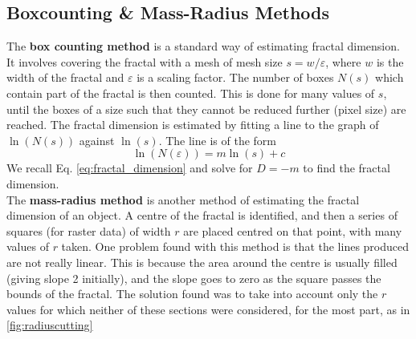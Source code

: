 \documentclass{article}
\theoremstyle{definition}
\theoremstyle{remark}
\begin{document}
\subsection{Boxcounting \& Mass-Radius Methods}
\indent The \textbf{box counting method} is a standard way of estimating fractal dimension. It involves covering the fractal with a mesh of mesh size $s = w/\varepsilon$, where $w$ is the width of the fractal and $\varepsilon$ is a scaling factor. The number of boxes $N(s)$ which contain part of the fractal is then counted. This is done for many values of $s$, until the boxes of a size such that they cannot be reduced further (pixel size) are reached. The fractal dimension is estimated by fitting a line to the graph of $\ln(N(s))$ against $\ln(s)$. The line is of the form
\begin{equation}
        \ln(N(\varepsilon)) = m\ln(s) + c
\end{equation}
We recall Eq. \ref{eq:fractal_dimension} and solve for $D=-m$ to find the fractal dimension.\\
\indent The \textbf{mass-radius method} is another method of estimating the fractal dimension of an object. A centre of the fractal is identified, and then a series of squares (for raster data) of width $r$ are placed centred on that point, with many values of $r$ taken. One problem found with this method is that the lines produced are not really linear. This is because the area around the centre is usually filled (giving slope 2 initially), and the slope goes to zero as the square passes the bounds of the fractal. The solution found was to take into account only the $r$ values for which neither of these sections were considered, for the most part, as in \ref{fig:radiuscutting}\\
\end{document}
